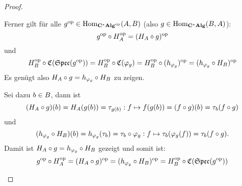 \begin{proof}
\begin{itemize}
Ferner gilt für alle $g^{\mathrm{op}} \in \mathrm{Hom}_{\mathbf{C^*Alg}^{\mathrm{op}}}(A,B)$ (also $g \in \mathrm{Hom}_{\mathbf{C^*Alg}}(B,A)$):
	\[g^{\mathrm{op}}\circ H_A^{\mathrm{op}} = (H_A\circ g)^{\mathrm{op}} \]
und
	\[H_B^{\mathrm{op}} \circ \mathfrak{C}(\mathfrak{Spec}(g^{\mathrm{op}})) = H_B^{\mathrm{op}} \circ \mathfrak{C}(\varphi_g) = H_B^{\mathrm{op}} \circ (h_{\varphi_g})^{\mathrm{op}} = (h_{\varphi_g}\circ H_B)^{\mathrm{op}}\]
Es genügt also $H_A\circ g = h_{\varphi_g}\circ H_B$ zu zeigen.

Sei dazu $b \in B$, dann ist
	\[(H_A\circ g) (b) = H_A(g(b)) = \tau_{g(b)}: f \mapsto f(g(b)) = (f \circ g)(b) = \tau_b(f\circ g)\]
und 
	\[(h_{\varphi_g}\circ H_B) (b) = h_{\varphi_g}(\tau_b) = \tau_b \circ \varphi_g: f \mapsto \tau_b(\varphi_g(f)) = \tau_b(f\circ g).\]
Damit ist $H_A\circ g = h_{\varphi_g}\circ H_B$ gezeigt und somit ist:
	\[g^{\mathrm{op}}\circ H_A^{\mathrm{op}} = (H_A\circ g)^{\mathrm{op}} = (h_{\varphi_g}\circ H_B)^{\mathrm{op}} = H_B^{\mathrm{op}} \circ \mathfrak{C}(\mathfrak{Spec}(g^{\mathrm{op}})) \qedhere\]
\end{itemize}
\end{proof}


